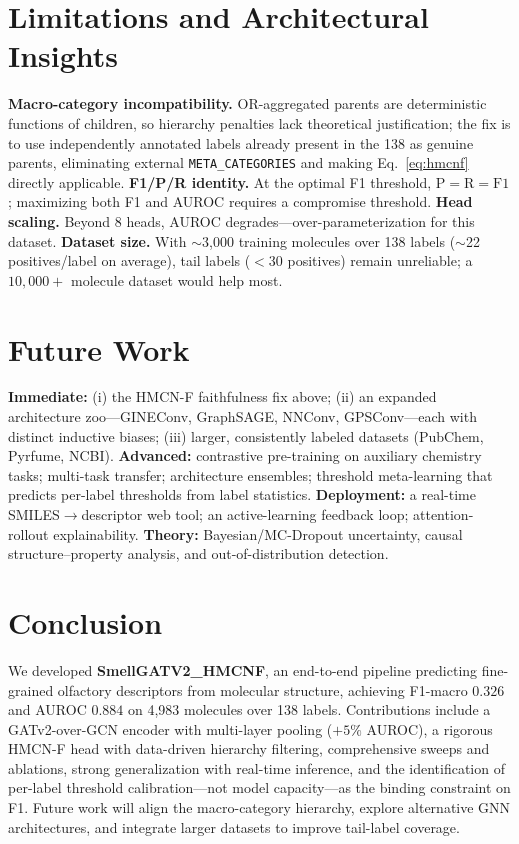\documentclass[10pt,twocolumn]{article}
\begin{document}
\section{Limitations and Architectural Insights}
\label{sec:limitations}
\textbf{Macro-category incompatibility.} OR-aggregated parents are deterministic functions of children, so hierarchy penalties lack theoretical justification; the fix is to use independently annotated labels already present in the 138 as genuine parents, eliminating external \texttt{META\_CATEGORIES} and making Eq.~\eqref{eq:hmcnf} directly applicable.
\textbf{F1/P/R identity.} At the optimal F1 threshold, $\mathrm{P}=\mathrm{R}=\mathrm{F1}$; maximizing both F1 and AUROC requires a compromise threshold.
\textbf{Head scaling.} Beyond 8 heads, AUROC degrades---over-parameterization for this dataset.
\textbf{Dataset size.} With $\sim$3{,}000 training molecules over 138 labels ($\sim$22 positives/label on average), tail labels ($<30$ positives) remain unreliable; a $10{,}000+$ molecule dataset would help most.

\section{Future Work}
\textbf{Immediate:} (i) the HMCN-F faithfulness fix above; (ii) an expanded architecture zoo---GINEConv, GraphSAGE, NNConv, GPSConv---each with distinct inductive biases; (iii) larger, consistently labeled datasets (PubChem, Pyrfume, NCBI).
\textbf{Advanced:} contrastive pre-training on auxiliary chemistry tasks; multi-task transfer; architecture ensembles; threshold meta-learning that predicts per-label thresholds from label statistics.
\textbf{Deployment:} a real-time SMILES$\rightarrow$descriptor web tool; an active-learning feedback loop; attention-rollout explainability.
\textbf{Theory:} Bayesian/MC-Dropout uncertainty, causal structure--property analysis, and out-of-distribution detection.

\section{Conclusion}
We developed \textbf{SmellGATV2\_HMCNF}, an end-to-end pipeline predicting fine-grained olfactory descriptors from molecular structure, achieving F1-macro $0.326$ and AUROC $0.884$ on 4{,}983 molecules over 138 labels. Contributions include a GATv2-over-GCN encoder with multi-layer pooling ($+5\%$ AUROC), a rigorous HMCN-F head with data-driven hierarchy filtering, comprehensive sweeps and ablations, strong generalization with real-time inference, and the identification of per-label threshold calibration---not model capacity---as the binding constraint on F1. Future work will align the macro-category hierarchy, explore alternative GNN architectures, and integrate larger datasets to improve tail-label coverage.
\end{document}
